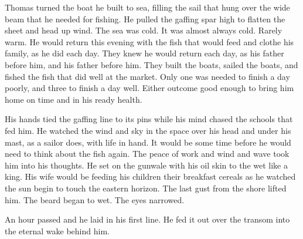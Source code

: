 

Thomas turned the boat he built to sea, filling the sail that hung
over the wide beam that he needed for fishing.  He pulled the gaffing
spar high to flatten the sheet and head up wind.  The sea was cold.
It was almost always cold.  Rarely warm.  He would return this evening
with the fish that would feed and clothe his family, as he did each
day.  They knew he would return each day, as his father before him,
and his father before him.  They built the boats, sailed the boats,
and fished the fish that did well at the market.  Only one was needed
to finish a day poorly, and three to finish a day well.  Either
outcome good enough to bring him home on time and in his ready health.

His hands tied the gaffing line to its pins while his mind chased the
schools that fed him.  He watched the wind and sky in the space over
his head and under his mast, as a sailor does, with life in hand.  It
would be some time before he would need to think about the fish again.
The peace of work and wind and wave took him into his thoughts.  He
set on the gunwale with his oil skin to the wet like a king.  His wife
would be feeding his children their breakfast cereals as he watched
the sun begin to touch the eastern horizon.  The last gust from the
shore lifted him.  The beard began to wet.  The eyes narrowed.

An hour passed and he laid in his first line.  He fed it out over the
transom into the eternal wake behind him.  

\bye
